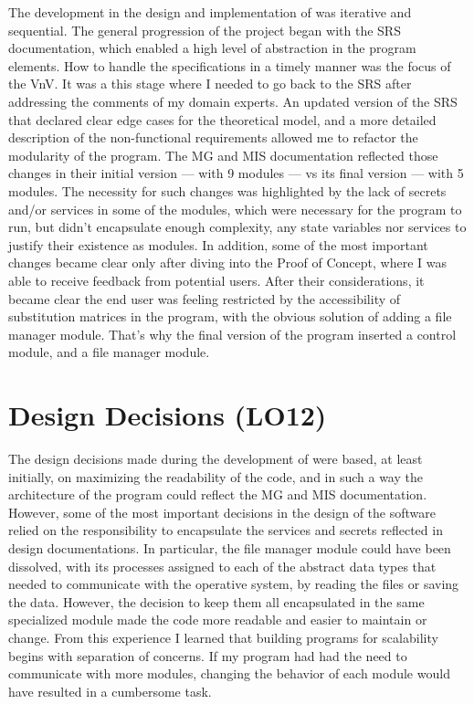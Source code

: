\documentclass{article}
\begin{document}
The development in the design and implementation of \progname{} was iterative and sequential. The general 
progression of the project began with the SRS documentation, which enabled a high level of abstraction in the 
program elements. How to handle the specifications in a timely manner was the focus of the VnV. It was a this stage 
where I needed to go back to the SRS after addressing the comments of my domain experts. 
An updated version of the SRS that declared clear edge cases for the theoretical model, and a more detailed description of the 
non-functional requirements allowed me to refactor the modularity of the program. The MG and MIS 
documentation reflected those changes in their initial version — with 9 modules — vs its final version 
— with 5 modules. The necessity for such changes was highlighted by the lack of secrets and/or services 
in some of the modules, which were necessary for the program to run, but didn't encapsulate enough complexity, any state variables
 nor services to justify their existence as modules.
In addition, some of the most important changes became clear only after diving into the Proof of Concept, where I was able 
to receive feedback from potential users. After their considerations, it became clear the end user was feeling restricted 
by the accessibility of substitution matrices in the program, with the obvious solution of adding a 
file manager module. That's why the final version of the program inserted a control module, 
and a file manager module.


\section{Design Decisions (LO12)}

The design decisions made during the development of \progname{} 
were based, at least initially, on maximizing the readability of the code, and 
in such a way the architecture of the program could reflect the MG and MIS documentation.
However, some of the most important decisions in the design of the software relied on the 
responsibility to encapsulate the services and secrets reflected in design documentations. 
In particular, the file manager module could have been dissolved, with its processes 
assigned to each of the abstract data types that needed to communicate with the operative system, 
by reading the files or saving the data. However, the decision to keep them all encapsulated in the same 
specialized module made the code more readable and easier to maintain or change. From this experience
I learned that building programs for scalability begins with separation of concerns. If my program 
had had the need to communicate with more modules, changing the behavior of each 
module would have resulted in a cumbersome task.
\end{document}
